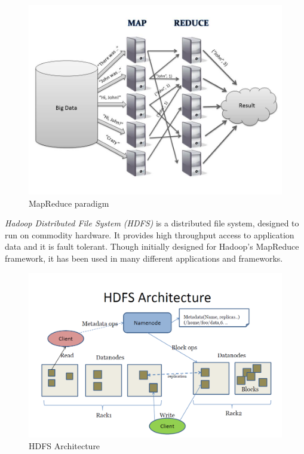 \documentclass[english]{tktltiki}
\begin{document}
\begin{figure}[ht!]
\centering
\includegraphics[width=130mm]{figures/mapreduce.jpg}
\caption[]{MapReduce paradigm \footnotemark}

\label{fig:mapreducepara}
\end{figure}

\textit{Hadoop Distributed File System (HDFS)} is a distributed file system, designed to run on commodity hardware. It provides high throughput access to application data and it is fault tolerant. Though initially designed for Hadoop's MapReduce framework, it has been used in many different applications and frameworks.
\begin{figure}[ht!]
\centering
\includegraphics[width=130mm]{figures/hdfsarchitecture.png}
\caption[]{HDFS Architecture \protect \footnotemark}
\label{fig:hdfsarch}
\end{figure}
\end{document}
